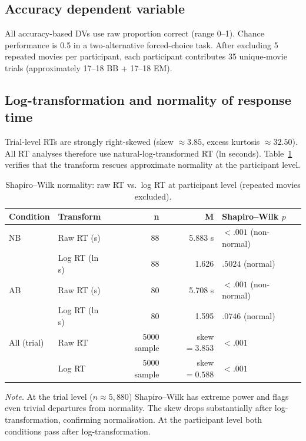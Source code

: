 \documentclass[12pt,a4paper]{article}
\begin{document}
\subsection{Accuracy dependent variable}
All accuracy-based DVs use raw proportion correct (range 0--1). Chance performance is 0.5
in a two-alternative forced-choice task. After excluding 5 repeated movies per participant,
each participant contributes 35 unique-movie trials (approximately 17--18 BB + 17--18 EM).

\subsection{Log-transformation and normality of response time}

Trial-level RTs are strongly right-skewed (skew $\approx 3.85$, excess kurtosis $\approx 32.50$). All RT analyses therefore use natural-log-transformed RT (ln seconds).
Table~\ref{tab:rt_normality} verifies that the transform rescues approximate normality
at the participant level.

\begin{table}[H]
\centering
\small
\begin{tabular}{llrrl}
\hline
\textbf{Condition} & \textbf{Transform} & \textbf{n} & \textbf{M} & \textbf{Shapiro--Wilk $p$} \\
\hline
NB & Raw RT (s) & 88 & 5.883 s & $<.001$ (non-normal) \\
   & Log RT (ln s) & 88 & 1.626 & $.5024$ (normal) \\
AB & Raw RT (s) & 80 & 5.708 s & $<.001$ (non-normal) \\
   & Log RT (ln s) & 80 & 1.595 & $.0746$ (normal) \\
All (trial) & Raw RT & 5000 sample & skew$=3.853$ & $<.001$ \\
            & Log RT & 5000 sample & skew$=0.588$ & $<.001$ \\
\hline
\end{tabular}
\caption{Shapiro--Wilk normality: raw RT vs.\ log RT at participant level (repeated movies excluded).}
\label{tab:rt_normality}
\end{table}

\noindent\textit{Note.} At the trial level ($n \approx 5,880$) Shapiro--Wilk has extreme power and flags even trivial departures from normality. The skew drops substantially after log-transformation, confirming normalisation. At the participant level both conditions pass after log-transformation.
\end{document}
